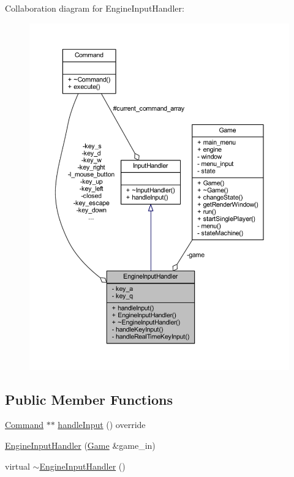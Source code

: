 Collaboration diagram for Engine\+Input\+Handler\+:\nopagebreak
\begin{figure}[H]
\begin{center}
\leavevmode
\includegraphics[width=350pt]{class_engine_input_handler__coll__graph}
\end{center}
\end{figure}
\subsection*{Public Member Functions}
\begin{DoxyCompactItemize}
\item 
\hyperlink{class_command}{Command} $\ast$$\ast$ \hyperlink{class_engine_input_handler_ade92afaf7657007c2be3b5bd745c96e3}{handle\+Input} () override
\item 
\hyperlink{class_engine_input_handler_ac33be38a17d38deb390b879ceb2e1e2f}{Engine\+Input\+Handler} (\hyperlink{class_game}{Game} \&game\+\_\+in)
\item 
virtual \hyperlink{class_engine_input_handler_a92a875197705110bd6b2debfe7dbee6a}{$\sim$\+Engine\+Input\+Handler} ()
\end{DoxyCompactItemize}
